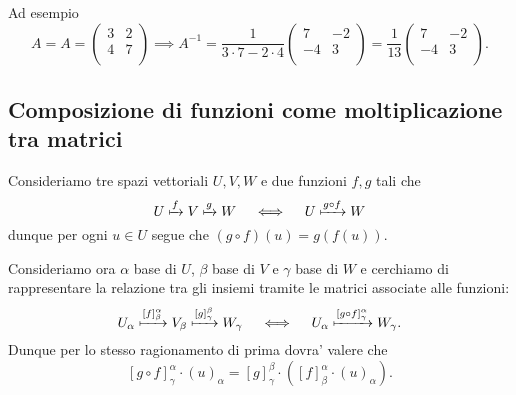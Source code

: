 Ad esempio \[
    A = A = \begin{pmatrix}
        3 & 2 \\
        4 & 7 \\
    \end{pmatrix} \implies 
    A^{-1} = \frac{1}{3 \cdot 7 - 2 \cdot 4}\begin{pmatrix}
        7  & -2 \\
        -4 & 3 \\
    \end{pmatrix} = \frac{1}{13}\begin{pmatrix}
        7  & -2 \\
        -4 & 3 \\
    \end{pmatrix}.    
\]

\subsection{Composizione di funzioni come moltiplicazione tra matrici}

Consideriamo tre spazi vettoriali $U, V, W$ e due funzioni $f, g$ tali che \[
    U \xmapsto{f} V \xmapsto{g} W  \quad  \iff  \quad  U \xmapsto{g \circ f} W
\] dunque per ogni $u \in U$ segue che $(g \circ f)(u) = g(f(u))$. 

Consideriamo ora $\alpha$ base di $U$, $\beta$ base di $V$ e $\gamma$ base di $W$ e cerchiamo di rappresentare la relazione tra gli insiemi tramite le matrici associate alle funzioni: \[
    U_{\alpha} \xmapsto{[f]^{\alpha}_{\beta}} V_{\beta} \xmapsto{[g]^{\beta}_{\gamma}} W_{\gamma}  \quad  \iff  \quad  U_{\alpha} \xmapsto{[g \circ f]^{\alpha}_{\gamma}} W_{\gamma}.
\] Dunque per lo stesso ragionamento di prima dovra' valere che \[
    [g \circ f]^{\alpha}_{\gamma}\cdot (u)_{\alpha} = [g]^{\beta}_{\gamma} \cdot \left( [f]^{\alpha}_{\beta} \cdot (u)_{\alpha} \right).
\]

